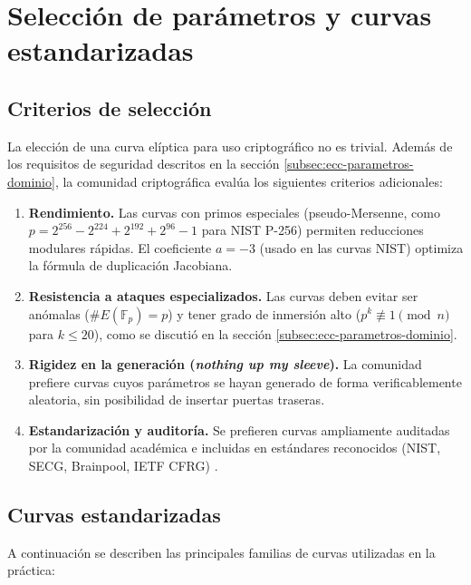 \section{Selección de parámetros y curvas estandarizadas}
\label{sec:ecc-parametros}

\subsection{Criterios de selección}
\label{subsec:ecc-criterios}

La elección de una curva elíptica para uso criptográfico no es trivial. Además de los requisitos de seguridad descritos en la sección \ref{subsec:ecc-parametros-dominio}, la comunidad criptográfica evalúa los siguientes criterios adicionales:

\begin{enumerate}
    \item \textbf{Rendimiento.} Las curvas con primos especiales (pseudo-Mersenne, como $p = 2^{256} - 2^{224} + 2^{192} + 2^{96} - 1$ para NIST P-256) permiten reducciones modulares rápidas. El coeficiente $a = -3$ (usado en las curvas NIST) optimiza la fórmula de duplicación Jacobiana.
    
    \item \textbf{Resistencia a ataques especializados.} Las curvas deben evitar ser anómalas ($\#E(\mathbb{F}_p) = p$) y tener grado de inmersión alto ($p^k \not\equiv 1 \pmod{n}$ para $k \leq 20$), como se discutió en la sección \ref{subsec:ecc-parametros-dominio}.
    
    \item \textbf{Rigidez en la generación (\textit{nothing up my sleeve}).} La comunidad prefiere curvas cuyos parámetros se hayan generado de forma verificablemente aleatoria, sin posibilidad de insertar puertas traseras.
    
    \item \textbf{Estandarización y auditoría.} Se prefieren curvas ampliamente auditadas por la comunidad académica e incluidas en estándares reconocidos (NIST, SECG, Brainpool, IETF CFRG) \cite{ietf-cfrg}.
\end{enumerate}


\subsection{Curvas estandarizadas}
\label{subsec:ecc-curvas-estandar}

A continuación se describen las principales familias de curvas utilizadas en la práctica:

